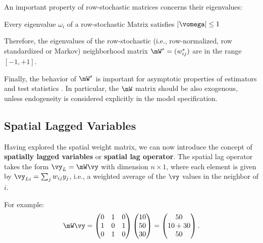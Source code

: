 \documentclass[english,12pt]{book}\usepackage[]{graphicx}\usepackage[]{xcolor}
\begin{document}
An important property of row-stochastic matrices concerns their eigenvalues:

\begin{theorem}\label{teo:eigen_values}
	Every eigenvalue $\omega_i$ of a row-stochastic Matrix satisfies $\left|\vomega\right|\leq 1$
\end{theorem}

Therefore, the eigenvalues of the row-stochastic (i.e., row-normalized, row standardized or Markov) neighborhood matrix $\mW^s=(w_{ij}^s)$ are in the range $\left[-1, +1\right]$.

Finally, the behavior of $\mW^s$ is important for asymptotic properties of estimators and test statistics \citep[][pp. 244]{AnselinBera1998}. In particular, the $\mW$ matrix should be also exogenous, unless endogeneity is considered explicitly in the model specification. 

\subsection{Spatial Lagged Variables}\label{sec:spatial_lag_var}

Having explored the spatial weight matrix, we can now introduce the concept of  \textbf{spatially lagged variables} or \textbf{spatial lag operator}. The spatial lag operator takes the form $\vy_L = \mW\vy$ with dimension $n \times 1$, where each element is given by $\vy_{Li} = \sum_{j}w_{ij}y_j$, i.e., a weighted average of the $\vy$ values in the neighbor of $i$.

For example:
\begin{equation*}
  \mW\vy =    \begin{pmatrix}
     0 & 1 & 0 \\
     1 & 0 & 1 \\
     0 & 1 & 0
  \end{pmatrix}
  \begin{pmatrix}
     10 \\
     50 \\
     30
  \end{pmatrix} =
  \begin{pmatrix}
     50 \\
     10 + 30 \\
     50
  \end{pmatrix}.
\end{equation*}
\end{document}
